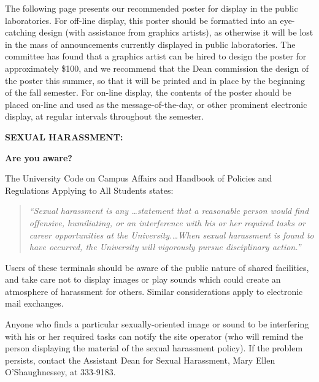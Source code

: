 The following page presents our recommended poster 
for display in the public laboratories.
For off-line display,
this poster should be formatted into an eye-catching design
(with assistance from graphics artists),
as otherwise it will be lost in the mass of announcements
currently displayed in public laboratories.
The committee has found that a graphics artist can be
hired to design the poster for approximately \$100,
and we recommend that the Dean commission the design of
the poster this summer, so that it will be printed and
in place by the beginning of the fall semester.
For on-line display, the contents of the poster should
be placed on-line and used as the message-of-the-day,
or other prominent electronic display, at regular intervals
throughout the semester.

\newpage
\centerline{\Huge\bf SEXUAL HARASSMENT:}
\vspace*{0.25in}
\centerline{\LARGE\bf Are you aware?}

\vspace*{1.0in}
\noindent
{\LARGE The University Code on Campus Affairs and Handbook of
Policies and Regulations Applying to All Students states:}

\vspace*{0.5in}

\begin{quotation}
\noindent
{\LARGE\em ``Sexual harassment is any \ldots statement that a reasonable 
person would find offensive, humiliating, or an interference with his 
or her required tasks or career opportunities at the 
University.\ldots When sexual harassment is found to have occurred, the
University will vigorously pursue disciplinary action.'' }
\end{quotation}

\vspace*{1.25in}

\noindent
{\LARGE Users of these terminals should be aware of the 
public nature of shared facilities, and take care not to display
images or play sounds which could create an atmosphere of
harassment for others.  Similar considerations apply to electronic
mail exchanges.}

\vspace*{0.50in}

\noindent
{\LARGE  Anyone who finds a particular sexually-oriented image 
or sound to be interfering with his or her required tasks 
can notify the site operator
(who will remind the person displaying the material of the sexual
harassment policy).
If the problem
persists, contact the Assistant Dean for Sexual Harassment, Mary Ellen
O'Shaughnessey, at 333-9183.}

